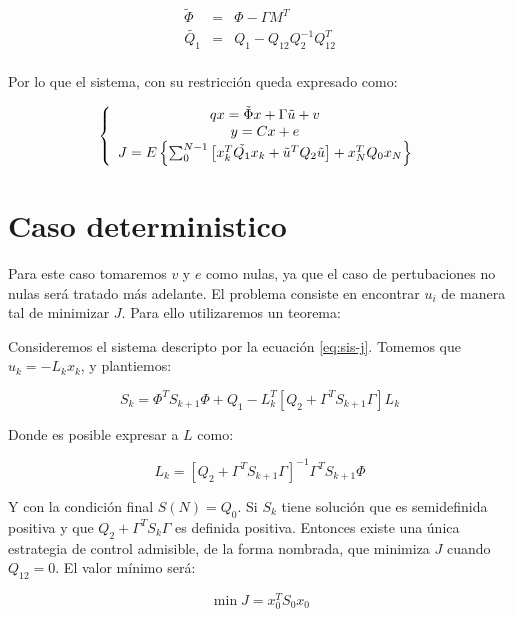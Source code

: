 \begin{equation}
    \begin{array}{ccc}
        \tilde{\Phi} & = & \Phi - \Gamma M^T \\ 
        \tilde{Q_1} & = & Q_1 - Q_{12}Q_2^{-1}Q_{12}^T \\ 
    \end{array}
\end{equation}

Por lo que el sistema, con su restricción queda expresado como: 

\begin{equation}
    \label{eq:sis-j}
    \left\{ \begin{array}{c} 
        qx = \tilde{\Phi}x + \Gamma \tilde{u} + v \\ 
        y = C x + e\\ 
        J = E\left\{ 
            \sum_0^{N-1}\left[ 
                x^T_k\tilde{Q_1}x_k + \tilde{u}^TQ_2\tilde{u}
            \right] + x^T_NQ_0x_N
        \right\}
     \end{array} \right.
\end{equation}

\section{Caso deterministico}

Para este caso tomaremos $v$ y $e$ como nulas, ya que el caso de pertubaciones no nulas será tratado más adelante.
El problema consiste en encontrar $u_i$ de manera tal de minimizar $J$. Para ello utilizaremos un teorema: 

Consideremos el sistema descripto por la ecuación \ref{eq:sis-j}. Tomemos que $u_k=-L_kx_k$, y plantiemos: 

\begin{equation}
    S_k = 
    \Phi^T S_{k+1} \Phi + Q_1 -
    L^T_k[ Q_2 + \Gamma^TS_{k+1}\Gamma ]L_k
\end{equation}

Donde es posible expresar a $L$ como: 

\begin{equation}
    L_k = 
    [Q_2 + \Gamma^TS_{k+1}\Gamma]^{-1}\Gamma^TS_{k+1}\Phi
\end{equation}

Y con la condición final $S(N)=Q_0$. Si $S_k$ tiene solución
que es semidefinida positiva y que $Q_2+\Gamma^TS_k\Gamma$ es definida positiva. 
Entonces existe una única estrategia de control admisible, de la forma nombrada, que 
minimiza $J$ cuando $Q_{12}=0$. El valor mínimo será:

\begin{equation}
    \min{J}=x_0^TS_0x_0
\end{equation}

